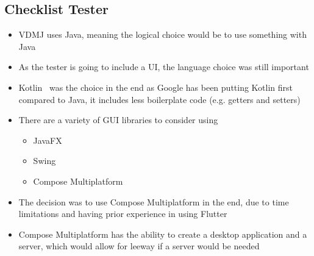 \documentclass[../dissertation.tex]{subfiles}
\begin{document}
\subsection{Checklist Tester}
\begin{itemize}
  \item VDMJ uses Java, meaning the logical choice would be to use something with Java
  \item As the tester is going to include a UI, the language choice was still important
  \item Kotlin~\cite{kotlin} was the choice in the end as Google has been putting Kotlin first
    compared to Java, it includes less boilerplate code (e.g. getters and setters)~\cite{android-kotlin}
  \item There are a variety of GUI libraries to consider using
    \begin{itemize}
      \item JavaFX~\cite{javafx}
      \item Swing~\cite{flatlaf}
      \item Compose Multiplatform~\cite{compose}
    \end{itemize}
  \item The decision was to use Compose Multiplatform in the end, due to time limitations and
    having prior experience in using Flutter~\cite{flutter}
  \item Compose Multiplatform has the ability to create a desktop application and a server,
    which would allow for leeway if a server would be needed
\end{itemize}
\end{document}
